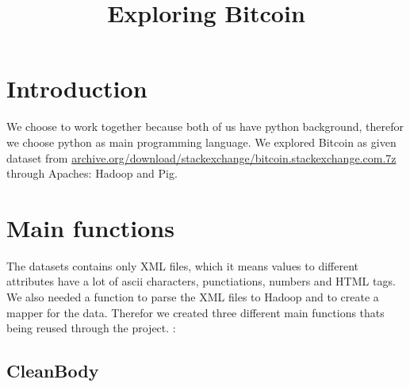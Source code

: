 \documentclass[fleqn,10pt]{wlscirep}
\title{Exploring Bitcoin }
\author{}
\begin{document}





\flushbottom
\maketitle

\tableofcontents
\newpage
\section*{Introduction}
We choose to work together because both of us have python background, therefor we choose python as main programming language. We explored Bitcoin as given dataset from \url{archive.org/download/stackexchange/bitcoin.stackexchange.com.7z}  through Apaches: Hadoop and Pig. 

\section*{Main functions}
The datasets contains only XML files, which it means values to different attributes have a lot of  ascii characters, punctiations, numbers and HTML tags. We also needed a function to parse the XML files to Hadoop and to create a mapper for the data.  Therefor we created three different main functions thats being reused through the project. : 
\subsection*{CleanBody}
\end{document}
